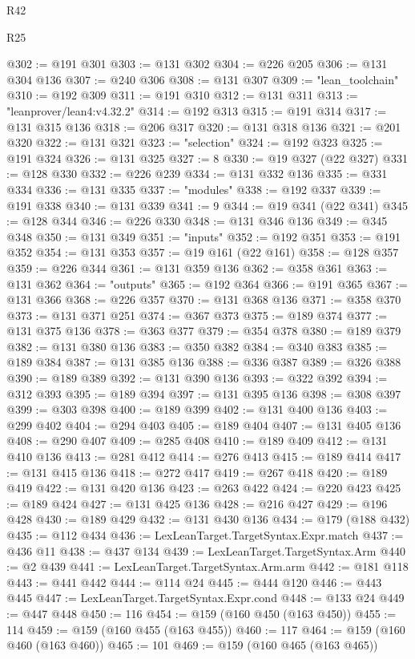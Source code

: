 \begin{lexlean}{R42}
\begin{lexlean}{R25}
\begin{coremodule}
{{{{{{{{{{{{{{{{{{{{{{{{{{{{{{{{{{{{{{{{{{{{{{{{{{{{{{{{{{{{{{{{{{{{{{{{{{{{{{{{{{{{{{{{{{{{{{{{{{{{{{{{{{{{{{{{{{{{{{{{{{{{{{{{{{{{{{{{{{{{{{{{{{{{{{{{{{{{{{{{{{{{{{{{{{{{{{{{{{{{{{{{{{{{{{{{{{{{{{{@302 := @191 @301
@303 := @131 @302
@304 := @226 @205
@306 := @131 @304 @136
@307 := @240 @306
@308 := @131 @307
@309 := "lean_toolchain"
@310 := @192 @309
@311 := @191 @310
@312 := @131 @311
@313 := "leanprover/lean4:v4.32.2"
@314 := @192 @313
@315 := @191 @314
@317 := @131 @315 @136
@318 := @206 @317
@320 := @131 @318 @136
@321 := @201 @320
@322 := @131 @321
@323 := "selection"
@324 := @192 @323
@325 := @191 @324
@326 := @131 @325
@327 := 8
@330 := @19 @327 (@22 @327)
@331 := @128 @330
@332 := @226 @239
@334 := @131 @332 @136
@335 := @331 @334
@336 := @131 @335
@337 := "modules"
@338 := @192 @337
@339 := @191 @338
@340 := @131 @339
@341 := 9
@344 := @19 @341 (@22 @341)
@345 := @128 @344
@346 := @226 @330
@348 := @131 @346 @136
@349 := @345 @348
@350 := @131 @349
@351 := "inputs"
@352 := @192 @351
@353 := @191 @352
@354 := @131 @353
@357 := @19 @161 (@22 @161)
@358 := @128 @357
@359 := @226 @344
@361 := @131 @359 @136
@362 := @358 @361
@363 := @131 @362
@364 := "outputs"
@365 := @192 @364
@366 := @191 @365
@367 := @131 @366
@368 := @226 @357
@370 := @131 @368 @136
@371 := @358 @370
@373 := @131 @371 @251
@374 := @367 @373
@375 := @189 @374
@377 := @131 @375 @136
@378 := @363 @377
@379 := @354 @378
@380 := @189 @379
@382 := @131 @380 @136
@383 := @350 @382
@384 := @340 @383
@385 := @189 @384
@387 := @131 @385 @136
@388 := @336 @387
@389 := @326 @388
@390 := @189 @389
@392 := @131 @390 @136
@393 := @322 @392
@394 := @312 @393
@395 := @189 @394
@397 := @131 @395 @136
@398 := @308 @397
@399 := @303 @398
@400 := @189 @399
@402 := @131 @400 @136
@403 := @299 @402
@404 := @294 @403
@405 := @189 @404
@407 := @131 @405 @136
@408 := @290 @407
@409 := @285 @408
@410 := @189 @409
@412 := @131 @410 @136
@413 := @281 @412
@414 := @276 @413
@415 := @189 @414
@417 := @131 @415 @136
@418 := @272 @417
@419 := @267 @418
@420 := @189 @419
@422 := @131 @420 @136
@423 := @263 @422
@424 := @220 @423
@425 := @189 @424
@427 := @131 @425 @136
@428 := @216 @427
@429 := @196 @428
@430 := @189 @429
@432 := @131 @430 @136
@434 := @179 (@188 @432)
@435 := @112 @434
@436 := LexLeanTarget.TargetSyntax.Expr.match
@437 := @436 @11
@438 := @437 @134
@439 := LexLeanTarget.TargetSyntax.Arm
@440 := @2 @439
@441 := LexLeanTarget.TargetSyntax.Arm.arm
@442 := @181 @118
@443 := @441 @442
@444 := @114 @24
@445 := @444 @120
@446 := @443 @445
@447 := LexLeanTarget.TargetSyntax.Expr.cond
@448 := @133 @24
@449 := @447 @448
@450 := 116
@454 := @159 (@160 @450 (@163 @450))
@455 := 114
@459 := @159 (@160 @455 (@163 @455))
@460 := 117
@464 := @159 (@160 @460 (@163 @460))
@465 := 101
@469 := @159 (@160 @465 (@163 @465))
}}}}}}}}}}}}}}}}}}}}}}}}}}}}}}}}}}}}}}}}}}}}}}}}}}}}}}}}}}}}}}}}}}}}}}}}}}}}}}}}}}}}}}}}}}}}}}}}}}}}}}}}}}}}}}}}}}}}}}}}}}}}}}}}}}}}}}}}}}}}}}}}}}}}}}}}}}}}}}}}}}}}}}}}}}}}}}}}}}}}}}}}}}}}}}}}}}}}}}}
\end{coremodule}
\end{lexlean}
\end{lexlean}
